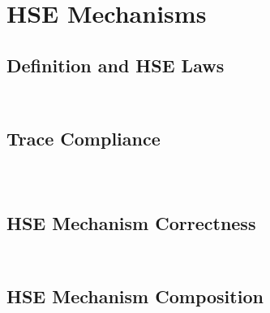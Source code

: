 \inputminted[gobble=2,firstline=90,lastline=92]{coq}{Listings/SpecCert.v}

\inputminted[gobble=2,firstline=94,lastline=99]{coq}{Listings/SpecCert.v}

\inputminted[gobble=2,firstline=101,lastline=109]{coq}{Listings/SpecCert.v}

\section{HSE Mechanisms}

\subsection{Definition and HSE Laws}

\inputminted[gobble=2,firstline=111,lastline=120]{coq}{Listings/SpecCert.v}

\inputminted[gobble=2,firstline=122,lastline=138]{coq}{Listings/SpecCert.v}

\subsection{Trace Compliance}

\inputminted[gobble=2,firstline=146,lastline=155]{coq}{Listings/SpecCert.v}

\inputminted[gobble=2,firstline=157,lastline=181]{coq}{Listings/SpecCert.v}

\inputminted[gobble=2,firstline=183,lastline=228]{coq}{Listings/SpecCert.v}

\subsection{HSE Mechanism Correctness}

\inputminted[gobble=2,firstline=230,lastline=235]{coq}{Listings/SpecCert.v}

\inputminted[gobble=2,firstline=237,lastline=259]{coq}{Listings/SpecCert.v}

\subsection{HSE Mechanism Composition}

\inputminted[gobble=2,firstline=400,lastline=406]{coq}{Listings/SpecCert.v}

\inputminted[gobble=2,firstline=408,lastline=421]{coq}{Listings/SpecCert.v}

\inputminted[gobble=2,firstline=422,lastline=426]{coq}{Listings/SpecCert.v}

